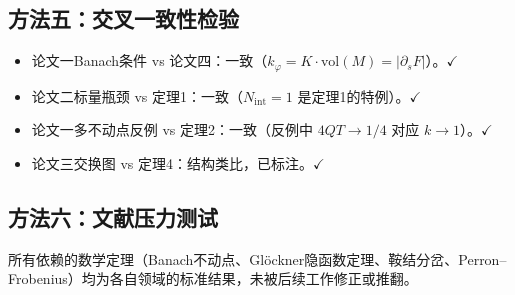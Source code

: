 \documentclass[12pt,a4paper]{article}
\theoremstyle{definition}
\newcommand{\vol}{\mathrm{vol}}
\begin{document}
\subsection{方法五：交叉一致性检验}

\begin{itemize}[leftmargin=*]
\item 论文一Banach条件 vs 论文四：一致（$k_\varphi = K \cdot \vol(M) = |\partial_s F|$）。$\checkmark$
\item 论文二标量瓶颈 vs 定理1：一致（$N_{\mathrm{int}} = 1$ 是定理1的特例）。$\checkmark$
\item 论文一多不动点反例 vs 定理2：一致（反例中 $4QT \to 1/4$ 对应 $k \to 1$）。$\checkmark$
\item 论文三交换图 vs 定理4：结构类比，已标注。$\checkmark$
\end{itemize}

\subsection{方法六：文献压力测试}

所有依赖的数学定理（Banach不动点、Glöckner隐函数定理、鞍结分岔、Perron--Frobenius）均为各自领域的标准结果，未被后续工作修正或推翻。
\end{document}
